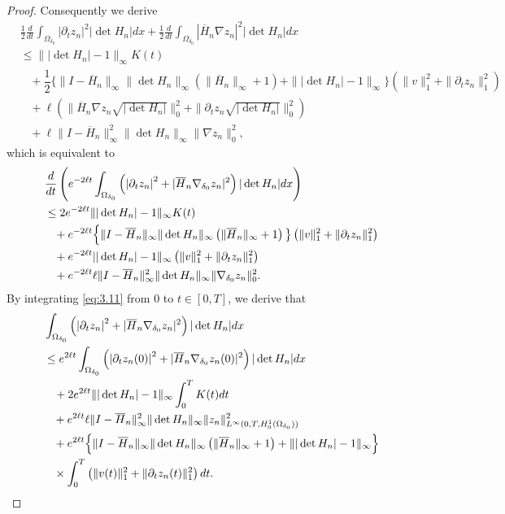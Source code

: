 \documentclass[10pt,a4paper]{amsart}
\begin{document}
\begin{proof}
Consequently we derive
\begin{align*}
    &\frac{1}{2} \frac{d}{dt}\int_{\Omega_{\delta_0}}\left|\partial_t z_n\right|^2 |\det H_n| dx + \frac{1}{2} \frac{d}{dt}\int_{\Omega_{\delta_0}}|\overline{H}_n\nabla z_n|^2|\det H_n|dx \\
    &\leq \||\det H_n| -1\|_{\infty} K(t) \\
    &\;\;\;+\dfrac{1}{2}\Big\{\|I-\overline{H}_n\|_{\infty}\|\det H_n\|_{\infty}\left(\|\overline{H}_n\|_{\infty}+1\right) +\||\det H_n |-1\|_{\infty}\Big\}\left(\|v\|_1^2+\|\partial_t z_n\|_1^2\right)\\
    &\;\;\;+ \ell(\|\overline{H}_n \nabla z_n \sqrt{|\det H_n|}\|^2_0+\|\partial_t z_n \sqrt{|\det H_n|}\|^2_0)\\ 
    &\;\;\;+\ell\|I - \overline{H}_n\|^2_\infty\|\det H_n\|_{\infty}\|\nabla z_n \|_0^2, 
\end{align*}
which is equivalent to
\begin{align}\label{eq:3.11}
    &\frac{d}{dt}\left(e^{-2\ell t}\int_{\Omega_{\delta_0}}\left(\left|\partial_t z_n\right|^2 +|\overline{H}_n\nabla_{\delta_0} z_n|^2\right)|\det H_n|dx\right)\\
    &\leq 2 e^{-2\ell t} \||\det H_n| -1\|_{\infty} K(t) \notag\\
    & \;\;\;+ e^{-2\ell t} \Big\{\|I-\overline{H}_n\|_{\infty}\|\det H_n\|_{\infty}\left(\|\overline{H}_n\|_{\infty}+1\right)\big\}\left(\|v\|_1^2+\|\partial_t z_n\|_1^2\right) \notag \\
    &\;\;\; + e^{-2\ell t}||\det H_n |-1\|_{\infty}\left(\|v\|_1^2+\|\partial_t z_n\|_1^2\right)\notag\\
    &\;\;\;+ e^{-2\ell t} \ell\|I - \overline{H}_n\|^2_\infty\|\det H_n\|_{\infty}\|\nabla_{\delta_0}z_n \|_0^2\notag.
\end{align}
By integrating \eqref{eq:3.11} from $0$ to $t\in [0,T]$, we derive that
\begin{align}\label{eq:3.12}
& \int_{\Omega_{\delta_0}}\left(\left|\partial_t z_n\right|^2 +|\overline{H}_n\nabla_{\delta_0} z_n|^2\right)|\det H_n|dx\\
&\leq e^{2\ell t}\int_{\Omega_{\delta_0}}\left(\left|\partial_t z_n(0)\right|^2 +|\overline{H}_n\nabla_{\delta_0} z_n(0)|^2\right)|\det H_n|dx \notag \\
&\;\;\ + 2e^{2\ell t}\||\det H_n |-1\|_{\infty}\int_0^T K(t)dt \notag \\
& \;\;\;+ e^{2\ell t} \ell\|I - \overline{H}_n\|^2_\infty \|\det H_n\|_\infty\|z_n \|^2_{L^{\infty}(0, T, H^1_0(\Omega_{\delta_0}))}\notag\\
&\;\;\;+e^{2\ell t}\Big\{\|I-\overline{H}_n\|_{\infty}\|\det H_n\|_{\infty}\left(\|\overline{H}_n\|_{\infty}+1\right)+\||\det H_n |-1\|_{\infty}\Big\} \notag\\
&\;\;\;\times  \int_0^T\left(\|v(t)\|_1^2+\|\partial_t z_n(t)\|_1^2\right)dt\notag.
\end{align}


\end{proof}
\end{document}
